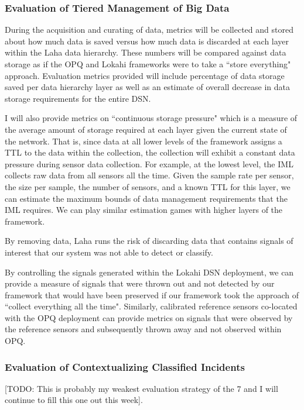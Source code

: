 \subsubsection{Evaluation of Tiered Management of Big Data}
During the acquisition and curating of data, metrics will be collected and stored about how much data is saved versus how much data is discarded at each layer within the Laha data hierarchy. These numbers will be compared against data storage as if the OPQ and Lokahi frameworks were to take a ``store everything" approach. Evaluation metrics provided will include percentage of data storage saved per data hierarchy layer as well as an estimate of overall decrease in data storage requirements for the entire DSN. 

I will also provide metrics on ``continuous storage pressure" which is a measure of the average amount of storage required at each layer given the current state of the network. That is, since data at all lower levels of the framework assigns a TTL to the data within the collection, the collection will exhibit a constant data pressure during sensor data collection. For example, at the lowest level, the IML collects raw data from all sensors all the time. Given the sample rate per sensor, the size per sample, the number of sensors, and a known TTL for this layer, we can estimate the maximum bounds of data management requirements that the IML requires. We can play similar estimation games with higher layers of the framework.

By removing data, Laha runs the risk of discarding data that contains signals of interest that our system was not able to detect or classify. 

By controlling the signals generated within the Lokahi DSN deployment, we can provide a measure of signals that were thrown out and not detected by our framework that would have been preserved if our framework took the approach of ``collect everything all the time". Similarly, calibrated reference sensors co-located with the OPQ deployment can provide metrics on signals that were observed by the reference sensors and subsequently thrown away and not observed within OPQ.

\subsubsection{Evaluation of Contextualizing Classified Incidents}
[TODO: This is probably my weakest evaluation strategy of the 7 and I will continue to fill this one out this week].

